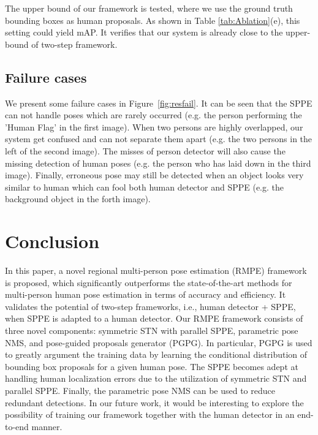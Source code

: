 \documentclass[10pt,twocolumn,letterpaper]{article}
\begin{document}
\vspace{1mm}
 The upper bound of our framework is tested, where we use the ground truth bounding boxes as human proposals. As shown in Table \ref{tab:Ablation}(e), this setting could yield  mAP. It verifies that our system is already close to the upper-bound of two-step framework.

\subsection{Failure cases}
We present some failure cases in Figure~\ref{fig:resfail}. It can be seen that the SPPE can not handle poses which are rarely occurred (e.g. the person performing the 'Human Flag' in the first image). When two persons are highly overlapped, our system get confused and can not separate them apart (e.g. the two persons in the left of the second image). The misses of person detector will also cause the missing detection of human poses (e.g. the person who has laid down in the third image). Finally, erroneous pose may still be detected when an object looks very similar to human  which can fool both human detector and SPPE (e.g. the background object in the forth image).


\section{Conclusion}
In this paper, a novel regional multi-person pose estimation (RMPE) framework is proposed, which significantly outperforms the state-of-the-art methods for multi-person human pose estimation in terms of accuracy and efficiency. It validates the potential of two-step frameworks, i.e., human detector + SPPE, when SPPE is adapted to a human detector. Our RMPE framework consists of three novel components: symmetric STN with parallel SPPE, parametric pose NMS, and pose-guided proposals generator (PGPG). In particular, PGPG is used to greatly argument the training data by learning the conditional distribution of bounding box proposals for a given human pose. The SPPE becomes adept at handling human localization errors due to the utilization of symmetric STN and parallel SPPE. Finally, the parametric pose NMS can be used to reduce redundant detections.
In our future work, it would be interesting to explore the possibility of training our framework together with the human detector in an end-to-end manner.














{\small


}
\end{document}
